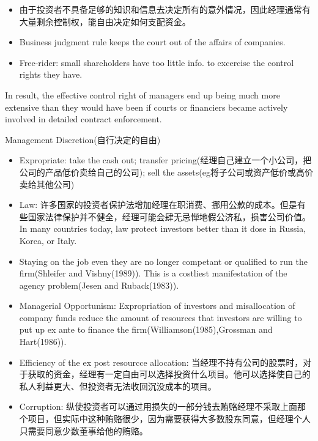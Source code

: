\begin{frame}
		\begin{itemize}
			\item 由于投资者不具备足够的知识和信息去决定所有的意外情况，因此经理通常有大量剩余控制权，能自由决定如何支配资金。
			\item Business judgment rule keeps the court out of the affairs of companies.
			\item Free-rider: small shareholders have too little info. to excercise the control rights they have.
		\end{itemize}

		\vspace{2em}
		 In result, the effective control right of managers end up being much more extensive than they would have been if courts or financiers became actively involved in detailed contract enforcement.

\end{frame}
	
	\begin{frame}{Management Discretion(自行决定的自由)}
		\begin{itemize}
			\item Expropriate: take the cash out; transfer pricing(经理自己建立一个小公司，把公司的产品低价卖给自己的公司); sell the assets(eg将子公司或资产低价或高价卖给其他公司)
			\item Law: 许多国家的投资者保护法增加经理在职消费、挪用公款的成本。但是有些国家法律保护并不健全，经理可能会肆无忌惮地假公济私，损害公司价值。In many countries today, law protect investors better than it dose in Russia, Korea, or Italy.
			\item Staying on the job even they are no longer competant or qualified to run the firm(Shleifer and Vishny(1989)). This is a costliest manifestation of the agency problem(Jesen and Ruback(1983)). 
		\end{itemize}
\end{frame}
	
\begin{frame}
		\begin{itemize}
			\item Managerial Opportunism: Expropriation of investors and misallocation of company funds reduce the amount of resources that investors are willing to put up ex ante to finance the firm(Williamson(1985),Grossman and Hart(1986)). 
			\item Efficiency of the ex post resourcce allocation: 当经理不持有公司的股票时，对于获取的资金，经理有一定自由可以选择投资什么项目。他可以选择使自己的私人利益更大、但投资者无法收回沉没成本的项目。
			\item Corruption: 纵使投资者可以通过用损失的一部分钱去贿赂经理不采取上面那个项目，但实际中这种贿赂很少，因为需要获得大多数股东同意，但经理个人只需要同意少数董事给他的贿赂。
		\end{itemize}
\end{frame}

